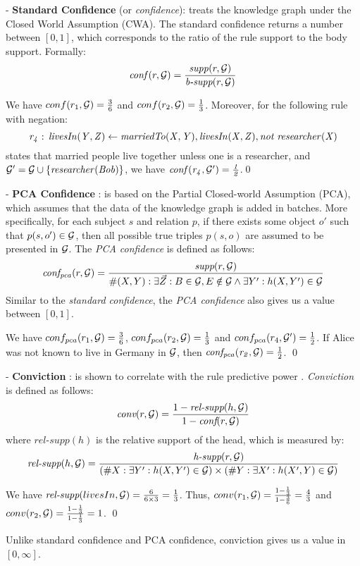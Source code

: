 \noindent- \textbf{Standard Confidence} (or \textit{confidence}): treats the knowledge graph under the Closed World Assumption (CWA). The standard confidence returns a number between $[0,1]$, which corresponds to the ratio of the rule support to the body support. Formally:
\begin{equation}\label{ex:m}
\mathit{conf}(r,\mathcal{G}) = \frac{\mathit{supp}(r,\mathcal{G})}{\textit{b-supp}(r,\mathcal{G})}
\end{equation}
\begin{example}
We have $conf(r_1,\mathcal{G}) = \frac{3}{6}$ and $conf(r_2,\mathcal{G}) = \frac{1}{3}$. Moreover, for the following rule with negation:
\[\mathit{r_4:\,livesIn(Y,Z) \leftarrow marriedTo(X,Y), livesIn(X,Z), not\;researcher(X)}\]
states that married people live together unless one is a researcher, 
and $\mathcal{G}'=\mathcal{G}\cup\{\mathit{researcher(Bob)}\}$, we have $\mathit{conf(r_4,\mathcal{G}') = \frac{1}{2}}$.\qed
\end{example}
\noindent- \textbf{PCA Confidence} \cite{amie}: is based on the Partial Closed-world Assumption (PCA), which assumes that the data of the knowledge graph is added in batches. More specifically, for each subject $s$ and relation $p$, if there exists some object $o'$ such that $p(s,o') \in \mathcal{G}$, then all possible true triples $p(s,o)$ are assumed to be presented in $\mathcal{G}$. The \textit{PCA confidence} is defined as follows:
\begin{equation}\label{eq:pca_conf}
\mathit{conf_{pca}}(r, \mathcal{G}) = \frac{\textit{supp}(r, \mathcal{G})}{\#(X,Y): \exists \vec{Z}: B \in \mathcal{G}, E \notin \mathcal{G}  \wedge \exists Y': h(X,Y')\in \mathcal{G}}
\end{equation}
Similar to the \textit{standard confidence}, the \textit{PCA confidence} also gives us a value between $[0,1]$.
\begin{example}
We have $conf_{pca}(r_1,\mathcal{G}) = \frac{3}{6}$, $conf_{pca}(r_2,\mathcal{G}) = \frac{1}{3}$ and $conf_{pca}(r_4,\mathcal{G}') = \frac{1}{2}$. If Alice was not known to live in Germany in $\mathcal{G}$, then $\mathit{conf_{pca}(r_2,\mathcal{G})}=\frac{1}{2}$. \qed
\end{example}

\noindent- \textbf{Conviction} \cite{trantowards}: is shown to correlate with the rule predictive power \cite{Azevedo2007}.
\textit{Conviction} is defined as follows:
\begin{equation}\label{eq:conv}
\textit{conv}(r,\mathcal{G}) = \frac{1 - \textit{rel-supp}(h, \mathcal{G})}{1-\textit{conf}(r,\mathcal{G})}
\end{equation}
where $\textit{rel-supp}(h)$ is the relative support of the head, which is measured by:
\begin{equation}
\textit{rel-supp}(h, \mathcal{G}) = \frac{\textit{h-supp}(r,\mathcal{G})}{(\# X: \exists Y' :h(X,Y') \in \mathcal{G}) \times (\#Y :\exists X': h(X',Y) \in \mathcal{G})}
\end{equation}
\begin{example}
We have $\textit{rel-supp}(livesIn, \mathcal{G}) = \frac{6}{6 \times 3} = \frac{1}{3}$. Thus, $conv(r_1,\mathcal{G}) = \frac{1 - \frac{1}{3}}{1 - \frac{3}{6}} = \frac{4}{3}$ and $conv(r_2,\mathcal{G}) = \frac{1 - \frac{1}{3}}{1 - \frac{1}{3}} = 1$.
\qed
\end{example}
Unlike standard confidence and PCA confidence, conviction gives us a value in $[0,\infty]$.
